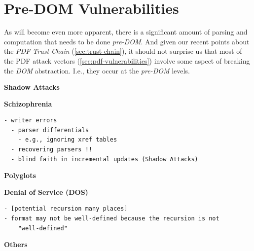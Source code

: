     
\section{Pre-DOM Vulnerabilities }
\label{sec:predom-vulnerabilities}

As will become even more apparent, there is a significant amount of
parsing and computation that needs to be done \emph{pre-DOM}.
And given our recent points about the \emph{PDF Trust Chain}
(\cref{sec:trust-chain}),
it should not surprise us that most of the PDF attack vectors
(\cref{sec:pdf-vulnerabilities})
involve some aspect of breaking the \emph{DOM} abstraction.
I.e., they occur at the \emph{pre-DOM} levels.


{\bf{Shadow Attacks}} 

{\bf{Schizophrenia}} 
\begin{lstlisting}[style=meta]
  - writer errors
  - parser differentials
    - e.g., ignoring xref tables
  - recovering parsers !!
  - blind faith in incremental updates (Shadow Attacks)
\end{lstlisting}

{\bf{Polyglots}} 

{\bf{Denial of Service (DOS)}} 
%
\begin{lstlisting}[style=meta]
- [potential recursion many places]
- format may not be well-defined because the recursion is not
    "well-defined"
\end{lstlisting}

{\bf{Others}} 